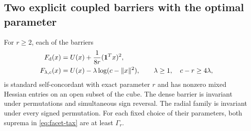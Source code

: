 \subsection{Two explicit coupled barriers with the optimal parameter}
\begin{theorem}
\label{thm:optimal-couplings}
For $r\geq2$, each of the barriers
\begin{align}
 F_{\mathrm d}(x)&=U(x)+\frac1{8r}(\mathbf1^Tx)^2,
       \label{eq:dense-barrier}\\
 F_{\lambda,c}(x)&=U(x)-\lambda\log(c-\lVert x\rVert^2),
 \qquad\lambda\geq1,\quad c-r\geq4\lambda,
       \label{eq:radial-barrier}
\end{align}
is standard self-concordant with exact parameter $r$ and has
nonzero mixed Hessian entries on an open subset of the cube.
The dense barrier is invariant under permutations and simultaneous
sign reversal. The radial family is invariant under every signed
permutation. For each fixed choice of their parameters, both suprema
in \eqref{eq:facet-tax} are at least $\Gamma_r$.
\end{theorem}
